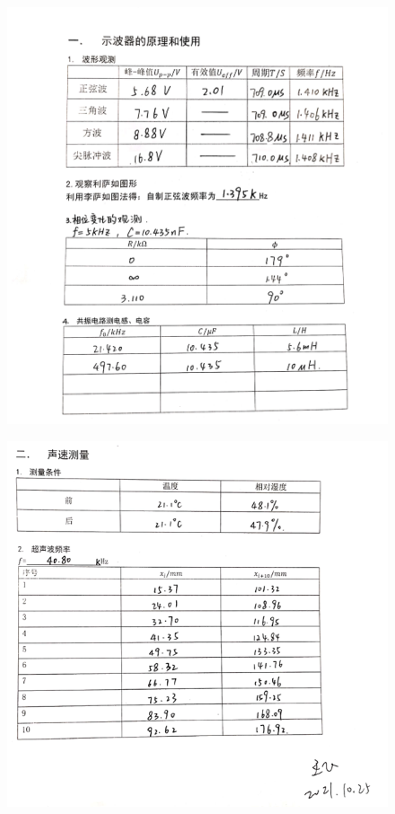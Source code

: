 \documentclass[UTF8]{ctexart}
\begin{document}
\begin{figure}[h]
    \centering
    \includegraphics[scale=0.9]{记录1.png}
\end{figure}
\begin{figure}[h]
    \centering
    \includegraphics[scale=1]{记录2.png}
\end{figure}
\end{document}
